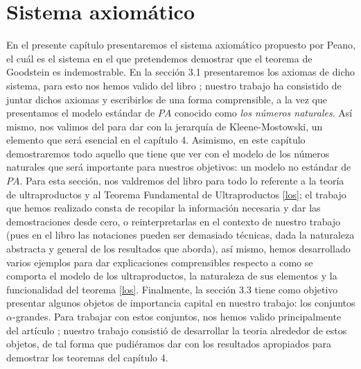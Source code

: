 \documentclass[12pt,a4paper]{book}
\newcommand{\PA}{\textit{PA}}
\numberwithin{thm}{chapter}
\theoremstyle{definition}
\begin{document}
\chapter{Sistema axiomático}
En el presente capítulo presentaremos el sistema axiomático propuesto por Peano, el cuál es el sistema en el que pretendemos demostrar que el teorema de Goodstein es indemostrable.
En la sección 3.1 presentaremos los axiomas de dicho sistema, para esto nos hemos valido del libro {\cite[Capítulo 2]{indicators}}; nuestro trabajo ha consistido de juntar dichos axiomas y escribirlos de una forma comprensible, a la vez que presentamos el modelo estándar de $\PA$ conocido como \textit{los números naturales}. Así mismo, nos valimos del {\cite{demoscomp}} para dar con la jerarquía de Kleene-Mostowski, un elemento que será esencial en el capítulo 4.
Asimismo, en este capítulo demostraremos todo aquello que tiene que ver con el modelo de los números naturales que será importante para nuestros objetivos: un modelo no estándar de $\PA$.
Para esta sección, nos valdremos del libro {\cite{Ultraproducts}} para todo lo referente a la teoría de ultraproductos y al Teorema Fundamental de Ultraproductos {\ref{los}}; el trabajo que hemos realizado consta de recopilar la información necesaria y dar las demostraciones desde cero, o reinterpretarlas en el contexto de nuestro trabajo (pues en el libro las notaciones pueden ser demasiado técnicas, dada la naturaleza abstracta y general de los resultados que aborda), así mismo, hemos desarrollado varios ejemplos para dar explicaciones comprensibles respecto a como se comporta el modelo de los ultraproductos, la naturaleza de sus elementos y la funcionalidad del teorema {\ref{los}}.
Finalmente, la sección 3.3 tiene como objetivo presentar algunos objetos de importancia capital en nuestro trabajo: los conjuntos $\alpha$-grandes. Para trabajar con estos conjuntos, nos hemos valido principalmente del artículo {\cite{Goodstein}}; nuestro trabajo consistió de desarrollar la teoria alrededor de estos objetos, de tal forma que pudiéramos dar con los resultados apropiados para demostrar los teoremas del capítulo 4.




\end{document}
